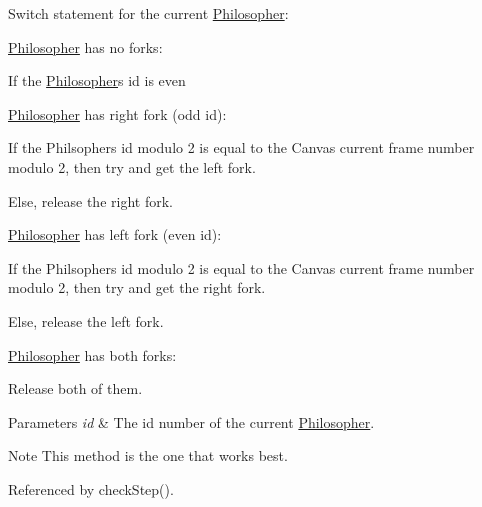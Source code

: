 \begin{DoxyItemize}
\item Switch statement for the current \hyperlink{class_philosopher}{Philosopher}\+:
\begin{DoxyItemize}
\item \hyperlink{class_philosopher}{Philosopher} has no forks\+:
\begin{DoxyItemize}
\item If the \hyperlink{class_philosopher}{Philosopher}\textquotesingle{}s id is even
\end{DoxyItemize}
\item \hyperlink{class_philosopher}{Philosopher} has right fork (odd id)\+:
\begin{DoxyItemize}
\item If the Philsopher\textquotesingle{}s id modulo 2 is equal to the Canvas\textquotesingle{} current frame number modulo 2, then try and get the left fork.
\item Else, release the right fork.
\end{DoxyItemize}
\item \hyperlink{class_philosopher}{Philosopher} has left fork (even id)\+:
\begin{DoxyItemize}
\item If the Philsopher\textquotesingle{}s id modulo 2 is equal to the Canvas\textquotesingle{} current frame number modulo 2, then try and get the right fork.
\item Else, release the left fork.
\end{DoxyItemize}
\item \hyperlink{class_philosopher}{Philosopher} has both forks\+:
\begin{DoxyItemize}
\item Release both of them.
\end{DoxyItemize}
\end{DoxyItemize}
\end{DoxyItemize}
\begin{DoxyParams}{Parameters}
{\em id} & The id number of the current \hyperlink{class_philosopher}{Philosopher}. \\
\hline
\end{DoxyParams}
\begin{DoxyNote}{Note}
This method is the one that works best. 
\end{DoxyNote}


Referenced by check\+Step().

\mbox{\label{class_table_ae8a58be3124849dbd9e687bf59541fcf}} 
